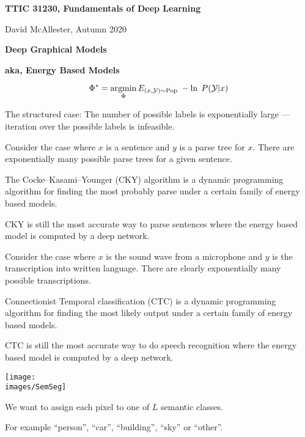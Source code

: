 




{\Huge

  \centerline{\bf TTIC 31230, Fundamentals of Deep Learning}
  \bigskip
  \centerline{David McAllester, Autumn 2020}
  \vfill
  \vfill
  \centerline{\bf Deep Graphical Models}
  \vfill
  \centerline{\bf aka, Energy Based Models}
\vfill
\vfill
\vfill


{\color{red}
$$\Phi^* = \operatorname*{argmin}_\Phi E_{(x,{\cal Y}) \sim \mathrm{Pop}}\;-\ln \;P({\cal Y}|x)$$
}

\vfill
{\color{red} The structured case:} The number of possible labels is exponentially large --- iteration over the possible labels is infeasible.


Consider the case where $x$ is a sentence and $y$ is a parse tree for $x$.  There are exponentially many possible parse trees for a given sentence.

\vfill
The Cocke–Kasami–Younger (CKY) algorithm is a dynamic programming algorithm for finding the most probably parse under a certain family of energy based models.

\vfill
CKY is still the most accurate way to parse sentences where the energy based model is computed by a deep network.


Consider the case where $x$ is the sound wave from a microphone and $y$ is the transcription into written language.  There are clearly exponentially many
possible transcriptions.

\vfill
Connectionist Temporal classification (CTC) is a dynamic programming algorithm for finding the most likely output under a certain family of energy based models.

\vfill
CTC is still the most accurate way to do speech recognition where the energy based model is computed by a deep network.


\centerline{\texttt{[image: \\images/SemSeg]}}

\vfill
We want to assign each pixel to one of $L$ semantic classes.

\vfill
For example ``person'', ``car'', ``building'', ``sky'' or ``other''.

}
